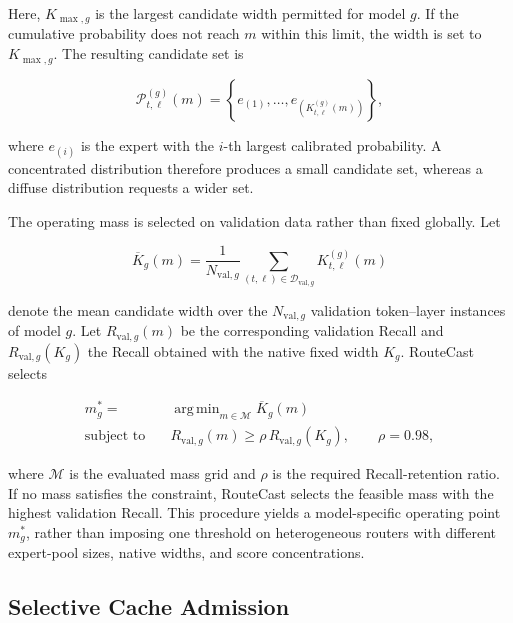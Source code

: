 \documentclass[conference]{IEEEtran}
\DeclareMathOperator*{\argmin}{arg\,min}
\begin{document}
Here, \(K_{\max,g}\) is the largest candidate width permitted for model
\(g\). If the cumulative probability does not reach \(m\) within this limit,
the width is set to \(K_{\max,g}\). The resulting candidate set is

\begin{equation}
\mathcal{P}_{t,\ell}^{(g)}(m)
=
\left\{
e_{(1)},\ldots,
e_{\left(K_{t,\ell}^{(g)}(m)\right)}
\right\},
\label{eq:adaptive-candidate-set}
\end{equation}

where \(e_{(i)}\) is the expert with the \(i\)-th largest calibrated
probability. A concentrated distribution therefore produces a small candidate
set, whereas a diffuse distribution requests a wider set.

The operating mass is selected on validation data rather than fixed globally.
Let

\begin{equation}
\overline{K}_{g}(m)
=
\frac{1}{N_{\mathrm{val},g}}
\sum_{(t,\ell)\in\mathcal{D}_{\mathrm{val},g}}
K_{t,\ell}^{(g)}(m)
\label{eq:mean-adaptive-width}
\end{equation}

denote the mean candidate width over the
\(N_{\mathrm{val},g}\) validation token--layer instances of model \(g\).
Let \(R_{\mathrm{val},g}(m)\) be the corresponding validation Recall and
\(R_{\mathrm{val},g}(K_g)\) the Recall obtained with the native fixed width
\(K_g\). RouteCast selects

\begin{equation}
\begin{aligned}
m_g^*
={}&
\argmin_{m\in\mathcal{M}}
\overline{K}_{g}(m) \\
\text{subject to}\quad
&
R_{\mathrm{val},g}(m)
\geq
\rho\,
R_{\mathrm{val},g}(K_g),
\qquad
\rho=0.98,
\end{aligned}
\label{eq:mass-selection}
\end{equation}

where \(\mathcal{M}\) is the evaluated mass grid and \(\rho\) is the required
Recall-retention ratio. If no mass satisfies the constraint, RouteCast selects
the feasible mass with the highest validation Recall. This procedure yields a
model-specific operating point \(m_g^*\), rather than imposing one threshold
on heterogeneous routers with different expert-pool sizes, native widths, and
score concentrations.


\subsection{Selective Cache Admission}
\end{document}

